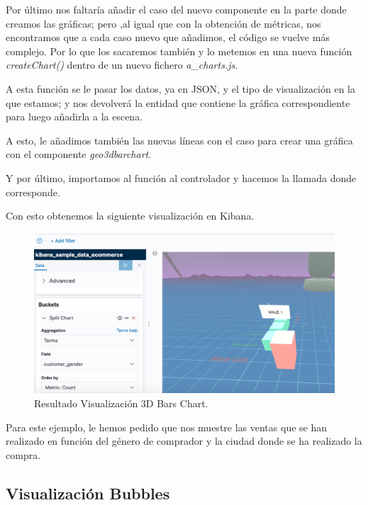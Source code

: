 \documentclass[a4paper, 12pt]{book}
\begin{document}
Por último nos faltaría añadir el caso del nuevo componente en la parte donde creamos las gráficas; pero ,al igual que con la obtención de métricas, nos encontramos que a cada caso nuevo que añadimos, el código se vuelve más complejo. Por lo que los sacaremos también y lo metemos en una nueva función \textit{createChart()} dentro de un nuevo fichero \textit{a\_charts.js}.

A esta función se le pasar los datos, ya en JSON, y el tipo de visualización en la que estamos; y nos devolverá la entidad que contiene la gráfica correspondiente para luego añadirla a la escena.

A esto, le añadimos también las nuevas líneas con el caso para crear una gráfica con el componente \textit{geo3dbarchart}.



Y por último, importamos al función al controlador y hacemos la llamada donde corresponde.



Con esto obtenemos la siguiente visualización en Kibana.

\begin{figure}[H]
  \centering
  \includegraphics[width=12cm, keepaspectratio]{img/development/3d-bar-chart.png}
  \caption{Resultado Visualización 3D Bars Chart.}
  \label{fig:3dbarchart}
\end{figure}

Para este ejemplo, le hemos pedido que nos muestre las ventas que se han realizado en función del género de comprador y la ciudad donde se ha realizado la compra.

\subsection{Visualización Bubbles}
\label{sec:bubbles}
\end{document}
